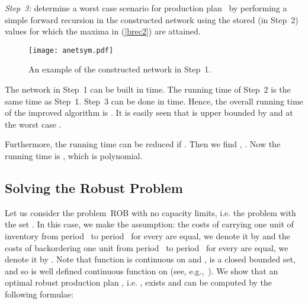 \documentclass[11pt]{article}
\begin{document}
\noindent \emph{Step~3:} determine a worst case scenario for
production plan~ by performing a simple 
forward recursion in the constructed network using the stored (in Step~2)
values for which 
the maxima in (\ref{brec2}) are attained.
\begin{figure}
\centering
	\texttt{[image: anetsym.pdf]}
	\caption{An example of the constructed network in Step~1.}\label{fig1}
\end{figure}




The network in Step~1 can be built in  time.
The running time of Step~2 is  the same time as Step~1.
Step~3 can be done in  time. Hence, the overall running time of
the improved algorithm is .
It is easily seen that  is upper 
bounded by  and 
at the worst case .


Furthermore, the running time can be reduced if
.
Then we find 
, .
 Now the running time is , which is polynomial.













\subsection{Solving the Robust Problem}
\label{ssrp}

Let us consider the problem~\textsc{ROB} with no capacity
limits, i.e. the problem with the set 
.
In this case, we make  the assumption: 
the costs of carrying one unit of 
inventory from period~ to period~ 
for every 
are equal,
we denote it by   and
the costs  of backordering one unit 
from period~ to period~ for every 
are equal,
we denote it by . 
 Note that
function
 is continuous on  and ,
 is a closed bounded set, and so  is 
well  defined continuous function on  (see, e.g.,~\cite[Theorem~1.4]{M70}).
We show that 
an optimal robust production plan , i.e. ,
exists and 
can be
computed by the following formulae:
\end{document}
